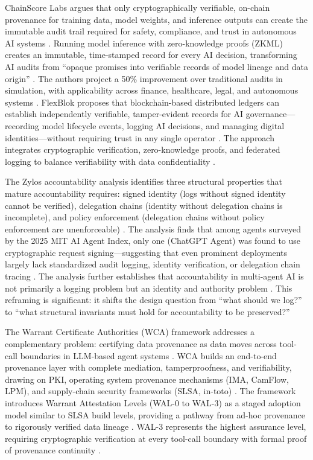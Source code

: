 \documentclass[11pt,oneside]{article}
\begin{document}
ChainScore Labs argues that only cryptographically verifiable, on-chain provenance for training data, model weights, and inference outputs can create the immutable audit trail required for safety, compliance, and trust in autonomous AI systems \cite{on_chain_provenance_ai}. Running model inference with zero-knowledge proofs (ZKML) creates an immutable, time-stamped record for every AI decision, transforming AI audits from ``opaque promises into verifiable records of model lineage and data origin'' \cite{on_chain_provenance_ai}. The authors project a 50\% improvement over traditional audits in simulation, with applicability across finance, healthcare, legal, and autonomous systems \cite{on_chain_provenance_ai}. FlexBlok proposes that blockchain-based distributed ledgers can establish independently verifiable, tamper-evident records for AI governance---recording model lifecycle events, logging AI decisions, and managing digital identities---without requiring trust in any single operator \cite{blockchain_ai_governance}. The approach integrates cryptographic verification, zero-knowledge proofs, and federated logging to balance verifiability with data confidentiality \cite{blockchain_ai_governance}.

The Zylos accountability analysis identifies three structural properties that mature accountability requires: signed identity (logs without signed identity cannot be verified), delegation chains (identity without delegation chains is incomplete), and policy enforcement (delegation chains without policy enforcement are unenforceable) \cite{zylos2026}. The analysis finds that among agents surveyed by the 2025 MIT AI Agent Index, only one (ChatGPT Agent) was found to use cryptographic request signing---suggesting that even prominent deployments largely lack standardized audit logging, identity verification, or delegation chain tracing \cite{zylos2026}. The analysis further establishes that accountability in multi-agent AI is not primarily a logging problem but an identity and authority problem \cite{zylos2026}. This reframing is significant: it shifts the design question from ``what should we log?'' to ``what structural invariants must hold for accountability to be preserved?''

The Warrant Certificate Authorities (WCA) framework addresses a complementary problem: certifying data provenance as data moves across tool-call boundaries in LLM-based agent systems \cite{wca2025}. WCA builds an end-to-end provenance layer with complete mediation, tamperproofness, and verifiability, drawing on PKI, operating system provenance mechanisms (IMA, CamFlow, LPM), and supply-chain security frameworks (SLSA, in-toto) \cite{wca2025}. The framework introduces Warrant Attestation Levels (WAL-0 to WAL-3) as a staged adoption model similar to SLSA build levels, providing a pathway from ad-hoc provenance to rigorously verified data lineage \cite{wca2025}. WAL-3 represents the highest assurance level, requiring cryptographic verification at every tool-call boundary with formal proof of provenance continuity \cite{wca2025}.
\end{document}
